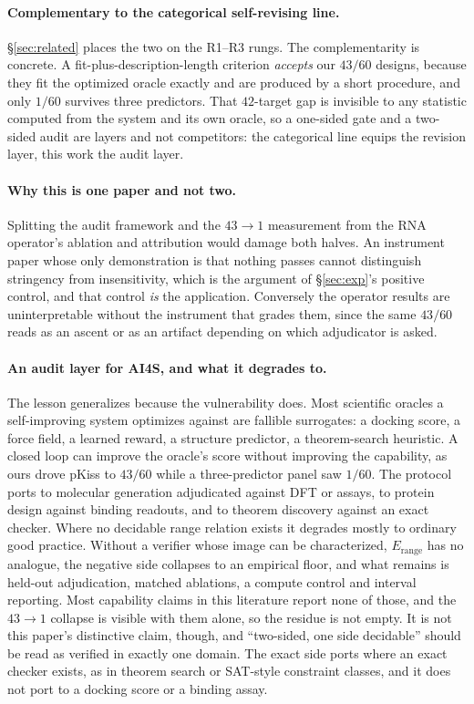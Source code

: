 \documentclass[11pt]{article}
\begin{document}
\paragraph{Complementary to the categorical self-revising line.} \S\ref{sec:related} places the two on the
R1--R3 rungs. The complementarity is concrete. A fit-plus-description-length criterion \emph{accepts} our
$43/60$ designs, because they fit the optimized oracle exactly and are produced by a short procedure, and only
$1/60$ survives three predictors. That $42$-target gap is invisible to any statistic computed from the system
and its own oracle, so a one-sided gate and a two-sided audit are layers and not competitors: the categorical
line equips the revision layer, this work the audit layer.

\paragraph{Why this is one paper and not two.} Splitting the audit framework and the $43\!\to\!1$ measurement
from the RNA operator's ablation and attribution would damage both halves. An instrument paper whose only
demonstration is that nothing passes cannot distinguish stringency from insensitivity, which is the argument
of \S\ref{sec:exp}'s positive control, and that control \emph{is} the application. Conversely the operator
results are uninterpretable without the instrument that grades them, since the same $43/60$ reads as an ascent
or as an artifact depending on which adjudicator is asked.

\paragraph{An audit layer for AI4S, and what it degrades to.} The lesson generalizes because the vulnerability
does. Most scientific oracles a self-improving system optimizes against are fallible surrogates: a docking
score, a force field, a learned reward, a structure predictor, a theorem-search heuristic. A closed loop can
improve the oracle's score without improving the capability, as ours drove pKiss to $43/60$ while a
three-predictor panel saw $1/60$. The protocol ports to molecular generation adjudicated against DFT or
assays, to protein design against binding readouts, and to theorem discovery against an exact checker. Where
no decidable range relation exists it degrades mostly to ordinary good practice. Without a verifier whose
image can be characterized, $E_{\mathrm{range}}$ has no analogue, the negative side collapses to an empirical
floor, and what remains is held-out adjudication, matched ablations, a compute control and interval reporting.
Most capability claims in this literature report none of those, and the $43\!\to\!1$ collapse is visible with
them alone, so the residue is not empty. It is not this paper's distinctive claim, though, and ``two-sided,
one side decidable'' should be read as verified in exactly one domain. The exact side ports where an exact
checker exists, as in theorem search or SAT-style constraint classes, and it does not port to a docking score
or a binding assay.
\end{document}
